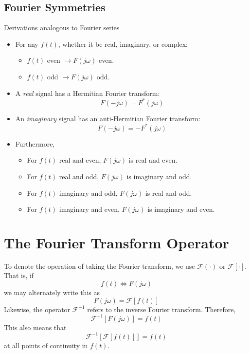 \documentclass[10pt]{article}
\begin{document}
\subsection*{Fourier Symmetries}
Derivations analogous to Fourier series
\begin{itemize}
    \item For any $f(t)$, whether it be real, imaginary, or complex:
    \begin{itemize}
        \item $f(t)$ even $\rightarrow F(j\omega)$ even.
        \item $f(t)$ odd $\rightarrow F(j\omega)$ odd.
    \end{itemize}
    \item A \textit{real} signal has a Hermitian Fourier transform:
    \[F(-j\omega) = F^*(j\omega)\]
    \item An \textit{imaginary} signal has an anti-Hermitian Fourier transform:
    \[F(-j\omega) = -F^*(j\omega)\]
    \item Furthermore,
    \begin{itemize}
        \item For $f(t)$ real and even, $F(j\omega)$ is real and even.
        \item For $f(t)$ real and odd, $F(j\omega)$ is imaginary and odd.
        \item For $f(t)$ imaginary and odd, $F(j\omega)$ is real and odd.
        \item For $f(t)$ imaginary and even, $F(j\omega)$ is imaginary and even.
    \end{itemize}
\end{itemize}

\section*{The Fourier Transform Operator}
To denote the operation of taking the Fourier transform, we use $\mathcal{F}(\cdot)$ or $\mathcal{F}[\cdot]$.  That is, if
\[f(t) \Longleftrightarrow F(j\omega)\]
we may alternately write this as
\[F(j\omega) = \mathcal{F}[f(t)]\]
Likewise, the operator $\mathcal{F}^{-1}$ refers to the inverse Fourier transform.  Therefore, 
\[\mathcal{F}^{-1}[F(j\omega)] = f(t)\]
This also means that
\[\mathcal{F}^{-1}[\mathcal{F}[f(t)]] = f(t)\]
at all points of continuity in $f(t)$.
\end{document}
